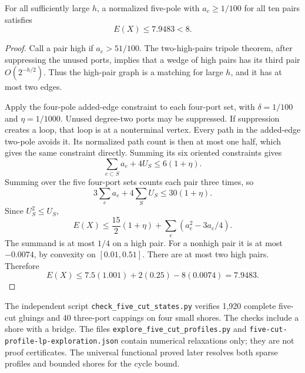 \begin{proposition}
\label{prop:five-pole-positive-energy-gap}
For all sufficiently large $h$, a normalized five-pole with $a_e\ge1/100$ for all ten pairs satisfies
\[
 E(X)\le7.9483<8.
\]
\end{proposition}
\begin{proof}
Call a pair high if $a_e>51/100$.
The two-high-pairs tripole theorem, after suppressing the unused ports, implies that a wedge of high pairs has its third pair $O(2^{-h/2})$.
Thus the high-pair graph is a matching for large $h$, and it has at most two edges.

Apply the four-pole added-edge constraint to each four-port set, with $\delta=1/100$ and $\eta=1/1000$.
Unused degree-two ports may be suppressed.
If suppression creates a loop, that loop is at a nonterminal vertex.
Every path in the added-edge two-pole avoids it.
Its normalized path count is then at most one half, which gives the same constraint directly.
Summing its six oriented constraints gives
\[
 \sum_{e\subset S}a_e+4U_S\le6(1+\eta).
\]
Summing over the five four-port sets counts each pair three times, so
\[
 3\sum_ea_e+4\sum_SU_S\le30(1+\eta).
\]
Since $U_S^2\le U_S$,
\[
 E(X)\le\frac{15}{2}(1+\eta)+\sum_e(a_e^2-3a_e/4).
\]
The summand is at most $1/4$ on a high pair.
For a nonhigh pair it is at most $-0.0074$, by convexity on $[0.01,0.51]$.
There are at most two high pairs.
Therefore
\[
 E(X)\le7.5(1.001)+2(0.25)-8(0.0074)=7.9483.
\]
\end{proof}

The independent script \texttt{check\_five\_cut\_states.py} verifies 1,920 complete five-cut gluings and 40 three-port cappings on four small shores.
The checks include a shore with a bridge.
The files \texttt{explore\_five\_cut\_profiles.py} and \texttt{five-cut-profile-lp-exploration.json} contain numerical relaxations only; they are not proof certificates.
The universal functional proved later resolves both sparse profiles and bounded shores for the cycle bound.
